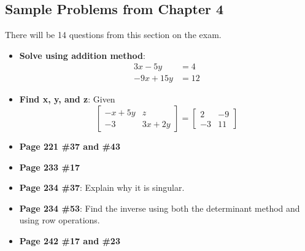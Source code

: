 \documentclass[12pt]{article}
\begin{document}
\subsection*{Sample Problems from Chapter 4}
There will be 14 questions from this section on the exam.
\begin{itemize}
\item \textbf{Solve using addition method}: 
\begin{align*} 
3x - 5y &= 4 \\ 
-9x + 15y &= 12
\end{align*}

\item \textbf{Find x, y, and z}:
Given
$$\begin{bmatrix}
-x + 5y & z \\
-3 & 3x + 2y
\end{bmatrix}
= 
\begin{bmatrix}
2 & -9 \\
-3 & 11
\end{bmatrix}
$$

\item \textbf{Page 221 \#37 and \#43}
\item \textbf{Page 233 \#17}
\item \textbf{Page 234 \#37}: Explain why it is singular.
\item \textbf{Page 234 \#53}: Find the inverse using both the determinant method and using row operations.
\item \textbf{Page 242 \#17 and \#23}






\end{itemize}
\end{document}
